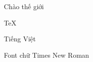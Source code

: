 \documentclass{report}
\begin{document}
Chào thế giới 

\TeX

Tiếng Việt

Font chữ Times New Roman
\end{document}
